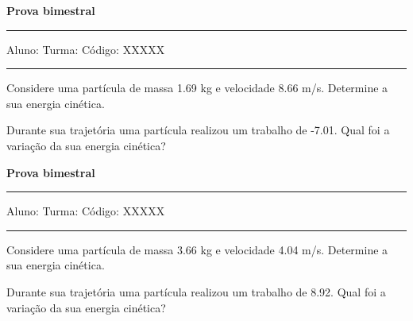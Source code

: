 \documentclass[addpoints]{exam}
\begin{document}
        
\begin{center}
	{\bf \Huge Prova bimestral}
	\vspace{1cm} \hrule \vspace{0.5cm}
	Aluno: \hfill Turma: \hfill Código: XXXXX
	\vspace{0.5cm} \hrule \vspace{0.5cm}
\end{center}
        \begin{questions}
\question[25] Considere uma partícula de massa    1.69 kg e velocidade    8.66 m/s. Determine a sua energia cinética.
\linebreak\linebreak
\begin{oneparchoices}
\end{oneparchoices}
\question[25] Durante sua trajetória uma partícula realizou um trabalho de   -7.01. Qual foi a variação da sua energia cinética?
\linebreak\linebreak
\begin{oneparchoices}
\end{oneparchoices}
\end{questions}
\newpage
\begin{center}
	{\bf \Huge Prova bimestral}
	\vspace{1cm} \hrule \vspace{0.5cm}
	Aluno: \hfill Turma: \hfill Código: XXXXX
	\vspace{0.5cm} \hrule \vspace{0.5cm}
\end{center}
        \begin{questions}
\question[25] Considere uma partícula de massa    3.66 kg e velocidade    4.04 m/s. Determine a sua energia cinética.
\linebreak\linebreak
\begin{oneparchoices}
\end{oneparchoices}
\question[25] Durante sua trajetória uma partícula realizou um trabalho de    8.92. Qual foi a variação da sua energia cinética?
\linebreak\linebreak
\begin{oneparchoices}
\end{oneparchoices}
\end{questions}
\newpage
\end{document}
